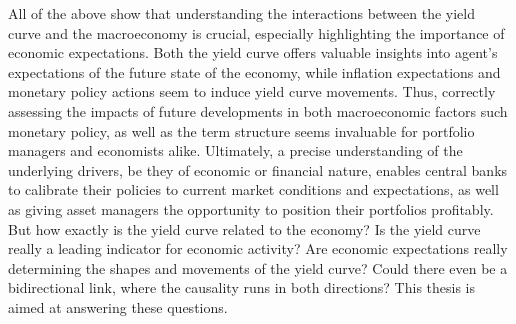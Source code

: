
All of the above show that understanding the interactions between the yield curve and the macroeconomy is crucial, especially highlighting the importance of economic expectations.
Both the yield curve offers valuable insights into agent's expectations of the future state of the economy, while inflation expectations and monetary policy actions seem to induce yield curve movements. 
Thus, correctly assessing the impacts of future developments in both macroeconomic factors such monetary policy, as well as the term structure seems invaluable for portfolio managers and economists alike.
Ultimately, a precise understanding of the underlying drivers, be they of economic or financial nature, enables central banks to calibrate their policies to current market conditions and expectations, as well as giving asset managers the opportunity to position their portfolios profitably. 
But how exactly is the yield curve related to the economy? 
Is the yield curve really a leading indicator for economic activity?
Are economic expectations really determining the shapes and movements of the yield curve?
Could there even be a bidirectional link, where the causality runs in both directions?
This thesis is aimed at answering these questions.

